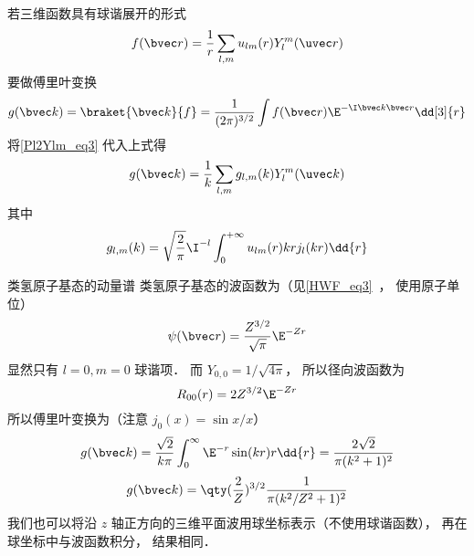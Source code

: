 若三维函数具有球谐展开的形式
\begin{equation}
f(\bvec r) = \frac{1}{r}\sum_{l,m} u_{lm}(r) Y_l^m(\uvec r)
\end{equation}
要做傅里叶变换
\begin{equation}
g(\bvec k) = \braket{\bvec k}{f} =  \frac{1}{(2\pi)^{3/2}} \int f(\bvec r) \E^{-\I \bvec k \bvec r} \dd[3]{r}
\end{equation}
将\autoref{Pl2Ylm_eq3} 代入上式得
\begin{equation}
g(\bvec k) = \frac{1}{k} \sum_{l,m} g_{l,m}(k)  Y_l^m(\uvec k) 
\end{equation}
其中
\begin{equation}
g_{l,m}(k) = \sqrt{\frac{2}{\pi}} \I^{-l} \int_0^{+\infty} u_{lm}(r) kr j_l(kr) \dd{r}
\end{equation}

\begin{example}{类氢原子基态的动量谱}\label{Pl2Ylm_ex1}
类氢原子基态的波函数为（见\autoref{HWF_eq3}~， 使用原子单位）
\begin{equation}
\psi(\bvec r) = \frac{Z^{3/2}}{\sqrt\pi} \E^{-Zr}
\end{equation}
显然只有 $l = 0, m = 0$ 球谐项． 而 $Y_{0,0} = 1/\sqrt{4\pi}$， 所以径向波函数为
\begin{equation}
R_{00}(r) = 2 Z^{3/2} \E^{-Zr}
\end{equation}
所以傅里叶变换为（注意 $j_0(x) = \sin x/x$）
\begin{equation}
g(\bvec k) = \frac{\sqrt{2}}{k\pi} \int_0^\infty \E^{-r} \sin(kr) r \dd{r} = \frac{2\sqrt{2}}{\pi(k^2+1)^2}
\end{equation}
\begin{equation}
g(\bvec k) = \qty(\frac{2}{Z})^{3/2} \frac{1}{\pi(k^2/Z^2 + 1)^2}
\end{equation}
我们也可以将沿 $z$ 轴正方向的三维平面波用球坐标表示（不使用球谐函数）， 再在球坐标中与波函数积分， 结果相同．
\end{example}
